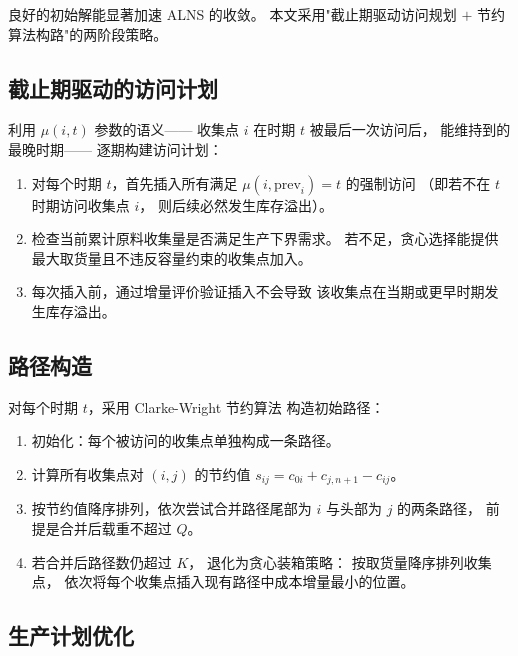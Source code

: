 \documentclass{article}
\begin{document}
良好的初始解能显著加速 ALNS 的收敛。
本文采用"截止期驱动访问规划 $+$ 节约算法构路"的两阶段策略。

\subsection{截止期驱动的访问计划}

利用 $\mu(i,t)$ 参数的语义——
收集点 $i$ 在时期 $t$ 被最后一次访问后，
能维持到的最晚时期——
逐期构建访问计划：

\begin{enumerate}
  \item 对每个时期 $t$，首先插入所有满足
    $\mu(i, \text{prev}_i) = t$ 的强制访问
    （即若不在 $t$ 时期访问收集点 $i$，
    则后续必然发生库存溢出）。
  \item 检查当前累计原料收集量是否满足生产下界需求。
    若不足，贪心选择能提供最大取货量且不违反容量约束的收集点加入。
  \item 每次插入前，通过增量评价验证插入不会导致
    该收集点在当期或更早时期发生库存溢出。
\end{enumerate}

\subsection{路径构造}

对每个时期 $t$，采用 Clarke-Wright 节约算法
\cite{Clarke1964} 构造初始路径：

\begin{enumerate}
  \item 初始化：每个被访问的收集点单独构成一条路径。
  \item 计算所有收集点对 $(i,j)$ 的节约值
    $s_{ij} = c_{0i} + c_{j,n{+}1} - c_{ij}$。
  \item 按节约值降序排列，依次尝试合并路径尾部为 $i$
    与头部为 $j$ 的两条路径，
    前提是合并后载重不超过 $Q$。
  \item 若合并后路径数仍超过 $K$，
    退化为贪心装箱策略：
    按取货量降序排列收集点，
    依次将每个收集点插入现有路径中成本增量最小的位置。
\end{enumerate}

\subsection{生产计划优化}
\end{document}
